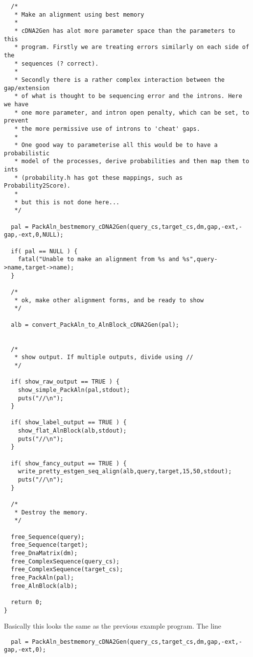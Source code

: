 \begin{verbatim}
  /*
   * Make an alignment using best memory
   *
   * cDNA2Gen has alot more parameter space than the parameters to this
   * program. Firstly we are treating errors similarly on each side of the
   * sequences (? correct). 
   *
   * Secondly there is a rather complex interaction between the gap/extension
   * of what is thought to be sequencing error and the introns. Here we have
   * one more parameter, and intron open penalty, which can be set, to prevent
   * the more permissive use of introns to 'cheat' gaps.
   *
   * One good way to parameterise all this would be to have a probabilistic
   * model of the processes, derive probabilities and then map them to ints
   * (probability.h has got these mappings, such as Probability2Score).
   *
   * but this is not done here...
   */     

  pal = PackAln_bestmemory_cDNA2Gen(query_cs,target_cs,dm,gap,-ext,-gap,-ext,0,NULL);

  if( pal == NULL ) {
    fatal("Unable to make an alignment from %s and %s",query->name,target->name);
  }

  /*
   * ok, make other alignment forms, and be ready to show
   */

  alb = convert_PackAln_to_AlnBlock_cDNA2Gen(pal);


  /*
   * show output. If multiple outputs, divide using //
   */

  if( show_raw_output == TRUE ) {
    show_simple_PackAln(pal,stdout);
    puts("//\n");
  }

  if( show_label_output == TRUE ) {
    show_flat_AlnBlock(alb,stdout);
    puts("//\n");
  }

  if( show_fancy_output == TRUE ) {
    write_pretty_estgen_seq_align(alb,query,target,15,50,stdout);
    puts("//\n");
  }

  /*
   * Destroy the memory.
   */  

  free_Sequence(query);
  free_Sequence(target);
  free_DnaMatrix(dm);
  free_ComplexSequence(query_cs);
  free_ComplexSequence(target_cs);
  free_PackAln(pal);
  free_AlnBlock(alb);

  return 0;
}
\end{verbatim}


Basically this looks the same as the previous example program. The line

\begin{verbatim}
  pal = PackAln_bestmemory_cDNA2Gen(query_cs,target_cs,dm,gap,-ext,-gap,-ext,0);
\end{verbatim}

